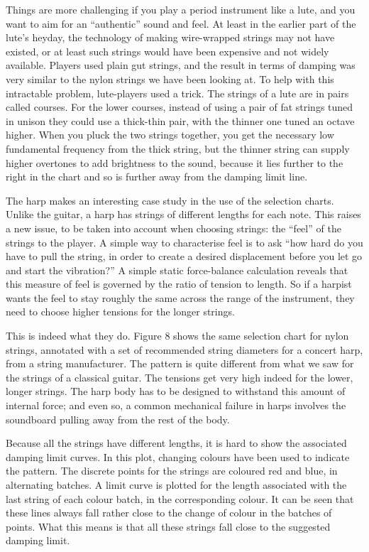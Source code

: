   Things are more challenging if you play a period instrument like a lute, and 
  you want to aim for an ``authentic'' sound and feel. At least in the earlier 
  part of the lute's heyday, the technology of making wire-wrapped strings may 
  not have existed, or at least such strings would have been expensive and not 
  widely available. Players used plain gut strings, and the result in terms of 
  damping was very similar to the nylon strings we have been looking at. To 
  help with this intractable problem, lute-players used a trick. The strings of 
  a lute are in pairs called courses. For the lower courses, instead of using a 
  pair of fat strings tuned in unison they could use a thick-thin pair, with 
  the thinner one tuned an octave higher. When you pluck the two strings 
  together, you get the necessary low fundamental frequency from the thick 
  string, but the thinner string can supply higher overtones to add brightness 
  to the sound, because it lies further to the right in the chart and so is 
  further away from the damping limit line. 


  The harp makes an interesting case study in the use of the selection charts. 
  Unlike the guitar, a harp has strings of different lengths for each note. 
  This raises a new issue, to be taken into account when choosing strings: the 
  ``feel'' of the strings to the player. A simple way to characterise feel is 
  to ask ``how hard do you have to pull the string, in order to create a 
  desired displacement before you let go and start the vibration?'' A simple 
  static force-balance calculation reveals that this measure of feel is 
  governed by the ratio of tension to length. So if a harpist wants the feel to 
  stay roughly the same across the range of the instrument, they need to choose 
  higher tensions for the longer strings. 

  This is indeed what they do. Figure 8 shows the same selection chart for 
  nylon strings, annotated with a set of recommended string diameters for a 
  concert harp, from a string manufacturer. The pattern is quite different from 
  what we saw for the strings of a classical guitar. The tensions get very high 
  indeed for the lower, longer strings. The harp body has to be designed to 
  withstand this amount of internal force; and even so, a common mechanical 
  failure in harps involves the soundboard pulling away from the rest of the 
  body. 

  Because all the strings have different lengths, it is hard to show the 
  associated damping limit curves. In this plot, changing colours have been 
  used to indicate the pattern. The discrete points for the strings are 
  coloured red and blue, in alternating batches. A limit curve is plotted for 
  the length associated with the last string of each colour batch, in the 
  corresponding colour. It can be seen that these lines always fall rather 
  close to the change of colour in the batches of points. What this means is 
  that all these strings fall close to the suggested damping limit. 

